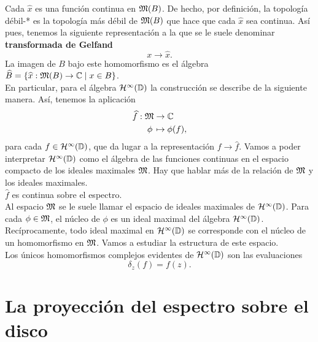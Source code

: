 Cada $\widehat x$ es una función continua en $\mathfrak{M} (B)$. De hecho, por definición, la topología débil-* es la topología más débil de $\mathfrak{M} (B)$ que hace que cada $\widehat x$ sea continua. Así pues, tenemos la siguiente representación a la que se le suele denominar \textbf{transformada de Gelfand}
\begin{equation*}
    x \to \widehat x.
\end{equation*}
La imagen de $B$ bajo este homomorfismo es el álgebra $\widehat B = \{\widehat x: \mathfrak{M}(B) \to  \mathbb{C} \mid x \in B\}$. \\

En particular, para el álgebra $\mathcal{H}^{\infty}(\mathbb{D})$ la construcción se describe de la siguiente manera. Así, tenemos la aplicación
\begin{equation*}
    \begin{split}
        \widehat f:  \mathfrak{M} & \to  \mathbb{C} \\
                \phi \, & \mapsto  \phi (f),
    \end{split}
\end{equation*}
para cada $f \in \mathcal{H}^{\infty}(\mathbb{D})$, que da lugar a la representación $f \to \widehat f$. Vamos a poder interpretar $\mathcal{H}^{\infty}(\mathbb{D})$ como el álgebra de las funciones continuas en el espacio compacto de los ideales maximales $\mathfrak{M}$. Hay que hablar más de la relación de $\mathfrak{M}$ y los ideales maximales. \\

$\widehat f$ es continua sobre el espectro. \\

Al espacio $\mathfrak{M}$ se le suele llamar el espacio de ideales maximales de $\mathcal{H}^{\infty}(\mathbb{D})$. Para cada $\phi \in \mathfrak{M}$, el núcleo de $\phi$ es un ideal maximal del álgebra $\mathcal{H}^{\infty}(\mathbb{D})$. Recíprocamente, todo ideal maximal en $\mathcal{H}^{\infty}(\mathbb{D})$ se corresponde con el núcleo de un homomorfismo en $\mathfrak{M}$. Vamos a estudiar la estructura de este espacio. \\

Los únicos homomorfismos complejos evidentes de $\mathcal{H}^{\infty}(\mathbb{D})$ son las evaluaciones
\begin{equation*}
    \delta_z (f) = f(z).
\end{equation*}


\section{La proyección del espectro sobre el disco}

